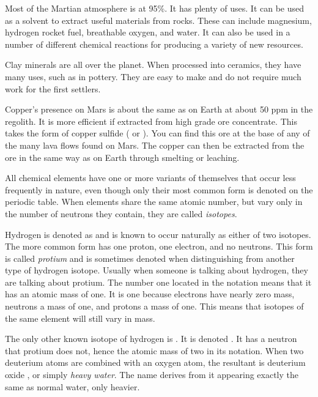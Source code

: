 Most of the Martian atmosphere is  at 95\%. It has plenty of uses. It can be used as a solvent to extract useful materials from rocks. These can include magnesium, hydrogen rocket fuel, breathable oxygen, and water. It can also be used in a number of different chemical reactions for producing a variety of new resources.

Clay minerals are all over the planet. When processed into ceramics, they have many uses, such as in pottery. They are easy to make and do not require much work for the first settlers.

Copper's presence on Mars is about the same as on Earth at about 50 ppm in the regolith. It is more efficient if extracted from high grade ore concentrate. This takes the form of copper sulfide ( or ). You can find this ore at the base of any of the many lava flows found on Mars. The copper can then be extracted from the ore in the same way as on Earth through smelting or leaching.

All chemical elements have one or more variants of themselves that occur less frequently in nature, even though only their most common form is denoted on the periodic table. When elements share the same atomic number, but vary only in the number of neutrons they contain, they are called {\it isotopes}.

Hydrogen is denoted as  and is known to occur naturally as either of two isotopes. The more common form has one proton, one electron, and no neutrons. This form is called {\it protium} and is sometimes denoted  when distinguishing from another type of hydrogen isotope. Usually when someone is talking about hydrogen, they are talking about protium. The number one located in the notation means that it has an atomic mass of one. It is one because electrons have nearly zero mass, neutrons a mass of one, and protons a mass of one. This means that isotopes of the same element will still vary in mass.

The only other known isotope of hydrogen is . It is denoted . It has a neutron that protium does not, hence the atomic mass of two in its notation. When two deuterium atoms are combined with an oxygen atom, the resultant is deuterium oxide , or simply {\it heavy water}. The name derives from it appearing exactly the same as normal water, only heavier.

